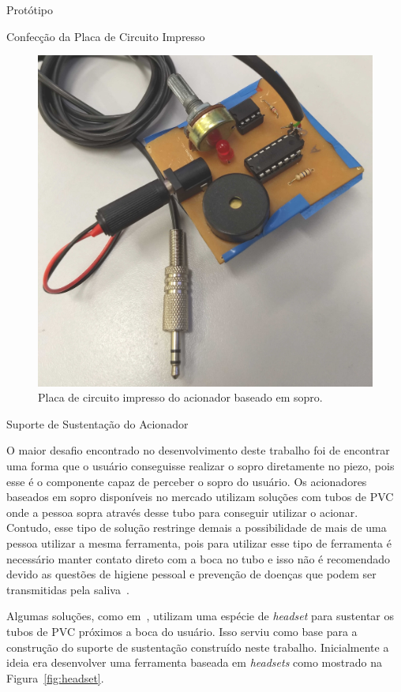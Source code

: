 \begin{chapter}{Protótipo}
\begin{section}{Confecção da Placa de Circuito Impresso}
\begin{figure}[!h]
	\centering
	\begin{minipage}[c]{\textwidth}
	\centering
	\includegraphics[width=0.6\linewidth]{fig/puff2}
	\caption{Placa de circuito impresso do acionador baseado em sopro.}
	\label{fig:placa}
	\end{minipage}
\end{figure} 

\end{section}


\begin{section}{Suporte de Sustentação do Acionador}

O maior desafio encontrado no desenvolvimento deste trabalho foi de encontrar
uma forma que o usuário conseguisse realizar o sopro diretamente no piezo, pois 
esse é o componente capaz de perceber o sopro do usuário. Os acionadores
baseados em sopro disponíveis no mercado utilizam soluções com tubos de PVC onde
a pessoa sopra através desse tubo para conseguir utilizar o acionar. Contudo,
esse tipo de solução restringe demais a possibilidade de mais de uma pessoa
utilizar a mesma ferramenta, pois para utilizar esse tipo de ferramenta é
necessário manter contato direto com a boca no tubo e isso não é recomendado
devido as questões de higiene pessoal e prevenção de doenças que podem ser 
transmitidas pela saliva~\cite{Li2000}.

Algumas soluções, como em~\cite{CorpPuff}, utilizam uma espécie de 
\textit{headset} para sustentar os tubos de PVC próximos a boca do usuário. Isso
serviu como base para a construção do suporte de sustentação construído neste
trabalho. Inicialmente a ideia era desenvolver uma ferramenta baseada em
\textit{headsets} como mostrado na Figura~\ref{fig:headset}.


\end{section}
\end{chapter}
